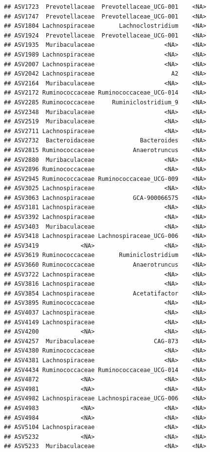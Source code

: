 \documentclass[]{article}
\begin{document}
\begin{verbatim}
## ASV1723  Prevotellaceae  Prevotellaceae_UCG-001    <NA>
## ASV1747  Prevotellaceae  Prevotellaceae_UCG-001    <NA>
## ASV1804 Lachnospiraceae       Lachnoclostridium    <NA>
## ASV1924  Prevotellaceae  Prevotellaceae_UCG-001    <NA>
## ASV1935  Muribaculaceae                    <NA>    <NA>
## ASV1989 Lachnospiraceae                    <NA>    <NA>
## ASV2007 Lachnospiraceae                    <NA>    <NA>
## ASV2042 Lachnospiraceae                      A2    <NA>
## ASV2164  Muribaculaceae                    <NA>    <NA>
## ASV2172 Ruminococcaceae Ruminococcaceae_UCG-014    <NA>
## ASV2285 Ruminococcaceae     Ruminiclostridium_9    <NA>
## ASV2348  Muribaculaceae                    <NA>    <NA>
## ASV2519  Muribaculaceae                    <NA>    <NA>
## ASV2711 Lachnospiraceae                    <NA>    <NA>
## ASV2732  Bacteroidaceae             Bacteroides    <NA>
## ASV2815 Ruminococcaceae           Anaerotruncus    <NA>
## ASV2880  Muribaculaceae                    <NA>    <NA>
## ASV2896 Ruminococcaceae                    <NA>    <NA>
## ASV2945 Ruminococcaceae Ruminococcaceae_UCG-009    <NA>
## ASV3025 Lachnospiraceae                    <NA>    <NA>
## ASV3063 Lachnospiraceae           GCA-900066575    <NA>
## ASV3181 Lachnospiraceae                    <NA>    <NA>
## ASV3392 Lachnospiraceae                    <NA>    <NA>
## ASV3403  Muribaculaceae                    <NA>    <NA>
## ASV3418 Lachnospiraceae Lachnospiraceae_UCG-006    <NA>
## ASV3419            <NA>                    <NA>    <NA>
## ASV3619 Ruminococcaceae       Ruminiclostridium    <NA>
## ASV3660 Ruminococcaceae           Anaerotruncus    <NA>
## ASV3722 Lachnospiraceae                    <NA>    <NA>
## ASV3816 Lachnospiraceae                    <NA>    <NA>
## ASV3854 Lachnospiraceae           Acetatifactor    <NA>
## ASV3895 Ruminococcaceae                    <NA>    <NA>
## ASV4037 Lachnospiraceae                    <NA>    <NA>
## ASV4149 Lachnospiraceae                    <NA>    <NA>
## ASV4200            <NA>                    <NA>    <NA>
## ASV4257  Muribaculaceae                 CAG-873    <NA>
## ASV4380 Ruminococcaceae                    <NA>    <NA>
## ASV4381 Lachnospiraceae                    <NA>    <NA>
## ASV4434 Ruminococcaceae Ruminococcaceae_UCG-014    <NA>
## ASV4872            <NA>                    <NA>    <NA>
## ASV4981            <NA>                    <NA>    <NA>
## ASV4982 Lachnospiraceae Lachnospiraceae_UCG-006    <NA>
## ASV4983            <NA>                    <NA>    <NA>
## ASV4984            <NA>                    <NA>    <NA>
## ASV5104 Lachnospiraceae                    <NA>    <NA>
## ASV5232            <NA>                    <NA>    <NA>
## ASV5233  Muribaculaceae                    <NA>    <NA>
\end{verbatim}
\end{document}
